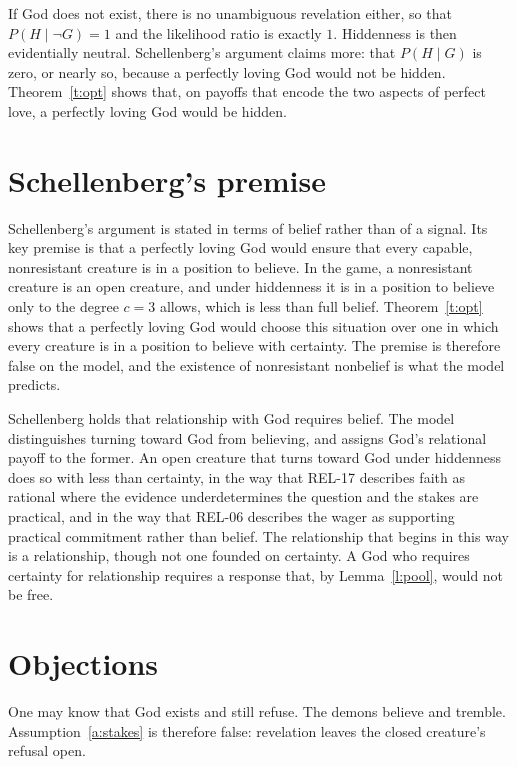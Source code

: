 \documentclass{situationist-preprint}
\begin{document}
If God does not exist, there is no unambiguous revelation either, so that $P(H \mid \neg G) = 1$ and the likelihood ratio is exactly $1$. Hiddenness is then evidentially neutral. Schellenberg's argument claims more: that $P(H \mid G)$ is zero, or nearly so, because a perfectly loving God would not be hidden. Theorem~\ref{t:opt} shows that, on payoffs that encode the two aspects of perfect love, a perfectly loving God would be hidden.

\section{Schellenberg's premise}\label{s:schellenberg}

Schellenberg's argument is stated in terms of belief rather than of a signal. Its key premise is that a perfectly loving God would ensure that every capable, nonresistant creature is in a position to believe. In the game, a nonresistant creature is an open creature, and under hiddenness it is in a position to believe only to the degree $c = 3$ allows, which is less than full belief. Theorem~\ref{t:opt} shows that a perfectly loving God would choose this situation over one in which every creature is in a position to believe with certainty. The premise is therefore false on the model, and the existence of nonresistant nonbelief is what the model predicts.

Schellenberg holds that relationship with God requires belief. The model distinguishes turning toward God from believing, and assigns God's relational payoff to the former. An open creature that turns toward God under hiddenness does so with less than certainty, in the way that REL-17 describes faith as rational where the evidence underdetermines the question and the stakes are practical, and in the way that REL-06 describes the wager as supporting practical commitment rather than belief. The relationship that begins in this way is a relationship, though not one founded on certainty. A God who requires certainty for relationship requires a response that, by Lemma~\ref{l:pool}, would not be free.

\section{Objections}\label{s:objections}

\begin{objection}
One may know that God exists and still refuse. The demons believe and tremble. Assumption~\ref{a:stakes} is therefore false: revelation leaves the closed creature's refusal open.
\end{objection}
\end{document}
